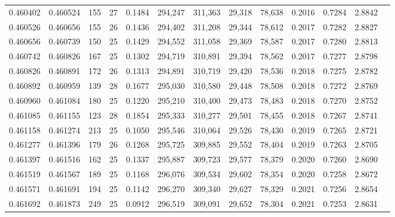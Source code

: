 \begin{tabular}{rrrrrrrrrrrrr}
0.460402 & 0.460524 & 155 &  27 &                                     0.1484 & 294,247 & 311,363 &  29,318 &  78,638 & 0.2016 & 0.7284 & 2.8842 \\
0.460526 & 0.460656 & 155 &  26 &                                     0.1436 & 294,402 & 311,208 &  29,344 &  78,612 & 0.2017 & 0.7282 & 2.8827 \\
0.460656 & 0.460739 & 150 &  25 &                                     0.1429 & 294,552 & 311,058 &  29,369 &  78,587 & 0.2017 & 0.7280 & 2.8813 \\
0.460742 & 0.460826 & 167 &  25 &                                     0.1302 & 294,719 & 310,891 &  29,394 &  78,562 & 0.2017 & 0.7277 & 2.8798 \\
0.460826 & 0.460891 & 172 &  26 &                                     0.1313 & 294,891 & 310,719 &  29,420 &  78,536 & 0.2018 & 0.7275 & 2.8782 \\
0.460892 & 0.460959 & 139 &  28 &                                     0.1677 & 295,030 & 310,580 &  29,448 &  78,508 & 0.2018 & 0.7272 & 2.8769 \\
0.460960 & 0.461084 & 180 &  25 &                                     0.1220 & 295,210 & 310,400 &  29,473 &  78,483 & 0.2018 & 0.7270 & 2.8752 \\
0.461085 & 0.461155 & 123 &  28 &                                     0.1854 & 295,333 & 310,277 &  29,501 &  78,455 & 0.2018 & 0.7267 & 2.8741 \\
0.461158 & 0.461274 & 213 &  25 &                                     0.1050 & 295,546 & 310,064 &  29,526 &  78,430 & 0.2019 & 0.7265 & 2.8721 \\
0.461277 & 0.461396 & 179 &  26 &                                     0.1268 & 295,725 & 309,885 &  29,552 &  78,404 & 0.2019 & 0.7263 & 2.8705 \\
0.461397 & 0.461516 & 162 &  25 &                                     0.1337 & 295,887 & 309,723 &  29,577 &  78,379 & 0.2020 & 0.7260 & 2.8690 \\
0.461519 & 0.461567 & 189 &  25 &                                     0.1168 & 296,076 & 309,534 &  29,602 &  78,354 & 0.2020 & 0.7258 & 2.8672 \\
0.461571 & 0.461691 & 194 &  25 &                                     0.1142 & 296,270 & 309,340 &  29,627 &  78,329 & 0.2021 & 0.7256 & 2.8654 \\
0.461692 & 0.461873 & 249 &  25 &                                     0.0912 & 296,519 & 309,091 &  29,652 &  78,304 & 0.2021 & 0.7253 & 2.8631 \\

\end{tabular}
